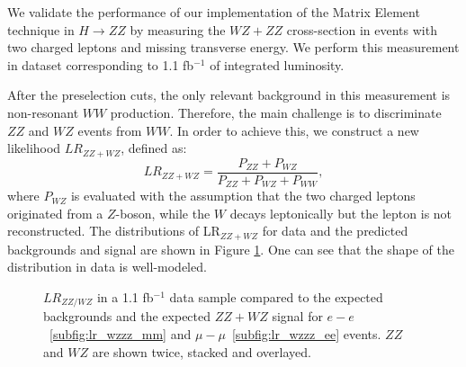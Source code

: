 We validate the performance of our implementation of the Matrix Element technique in $H\rightarrow ZZ$ by measuring
the $WZ+ZZ$ cross-section in events with two charged leptons and missing transverse energy. We perform this measurement
in dataset corresponding to 1.1 fb$^{-1}$ of integrated luminosity.
 
After the preselection cuts, the only relevant background in this measurement is non-resonant $WW$ production.
Therefore, the main challenge is to discriminate $ZZ$ and $WZ$ events from $WW$.
In order to achieve this, we construct a new likelihood $LR_{ZZ+WZ}$, defined as:
\begin{equation}
\label{eqn:LRZZ}
LR_{ZZ+WZ} = \frac { P_{ZZ}+P_{WZ}} { P_{ZZ} + P_{WZ} + P_{WW} },
\end{equation}
where $P_{WZ}$ is evaluated with the assumption that the two charged leptons originated from a $Z$-boson, while 
the $W$ decays leptonically but the lepton is not reconstructed. The distributions of LR$_{ZZ+WZ}$ for data and 
the predicted backgrounds and signal are shown in Figure \ref{fig:lrzz}. One can see that the shape of the distribution
in data is well-modeled.

\begin{figure}[!htbp]
\begin{center}
\caption{$LR_{ZZ/WZ}$ in a 1.1 fb$^{-1}$ data sample compared to the expected backgrounds and the expected
$ZZ+WZ$ signal for $e-e$~\ref{subfig:lr_wzzz_mm} and $\mu-\mu$~\ref{subfig:lr_wzzz_ee} events. $ZZ$ and $WZ$ are shown twice, stacked and overlayed.}
\label{fig:lrzz}
\end{center}
\end{figure}

